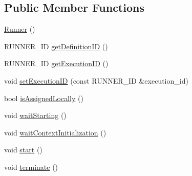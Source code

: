 \subsection*{Public Member Functions}
\begin{CompactItemize}
\item 
\hypertarget{classRunner_7acb8258c21da9daa62f9a177a2e5acd}{
\hyperlink{classRunner_7acb8258c21da9daa62f9a177a2e5acd}{Runner} ()}
\label{classRunner_7acb8258c21da9daa62f9a177a2e5acd}

\item 
\hypertarget{classRunner_f055608a382a32c6a889b0407e228312}{
RUNNER\_\-ID \hyperlink{classRunner_f055608a382a32c6a889b0407e228312}{get\-Definition\-ID} ()}
\label{classRunner_f055608a382a32c6a889b0407e228312}

\item 
\hypertarget{classRunner_95c5e10928221a6140557e2ca6af5434}{
RUNNER\_\-ID \hyperlink{classRunner_95c5e10928221a6140557e2ca6af5434}{get\-Execution\-ID} ()}
\label{classRunner_95c5e10928221a6140557e2ca6af5434}

\item 
\hypertarget{classRunner_5262b394f0f0899b85316136941df42c}{
void \hyperlink{classRunner_5262b394f0f0899b85316136941df42c}{set\-Execution\-ID} (const RUNNER\_\-ID \&execution\_\-id)}
\label{classRunner_5262b394f0f0899b85316136941df42c}

\item 
\hypertarget{classRunner_1ec095cb08373aaebbce6fe6418cd53c}{
bool \hyperlink{classRunner_1ec095cb08373aaebbce6fe6418cd53c}{is\-Assigned\-Locally} ()}
\label{classRunner_1ec095cb08373aaebbce6fe6418cd53c}

\item 
\hypertarget{classRunner_5bc239db2be753b77369fa9a038769fd}{
void \hyperlink{classRunner_5bc239db2be753b77369fa9a038769fd}{wait\-Starting} ()}
\label{classRunner_5bc239db2be753b77369fa9a038769fd}

\item 
\hypertarget{classRunner_756ad5e211d4818a88d53fa9ac272f68}{
void \hyperlink{classRunner_756ad5e211d4818a88d53fa9ac272f68}{wait\-Context\-Initialization} ()}
\label{classRunner_756ad5e211d4818a88d53fa9ac272f68}

\item 
\hypertarget{classRunner_7dc4419051fcc5cc9dadd54ecc9cd47d}{
void \hyperlink{classRunner_7dc4419051fcc5cc9dadd54ecc9cd47d}{start} ()}
\label{classRunner_7dc4419051fcc5cc9dadd54ecc9cd47d}

\item 
\hypertarget{classRunner_0f133e75c28fb8264549814f80608e68}{
void \hyperlink{classRunner_0f133e75c28fb8264549814f80608e68}{terminate} ()}
\label{classRunner_0f133e75c28fb8264549814f80608e68}


\end{CompactItemize}
